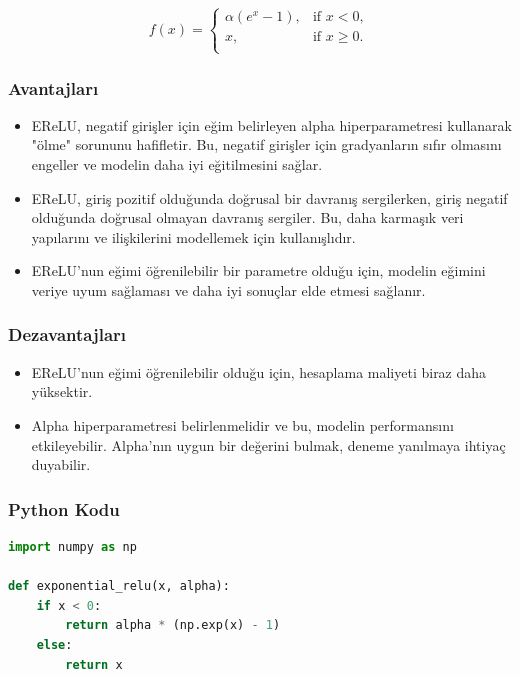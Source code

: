 \[f(x) = \begin{cases} 
\alpha(e^x - 1), & \text{if } x < 0, \\
x, & \text{if } x \geq 0. \\
\end{cases}\]

\subsubsection{Avantajları}
\begin{itemize}
    \item EReLU, negatif girişler için eğim belirleyen alpha hiperparametresi kullanarak "ölme" sorununu hafifletir. Bu, negatif girişler için gradyanların sıfır olmasını engeller ve modelin daha iyi eğitilmesini sağlar.
    \item EReLU, giriş pozitif olduğunda doğrusal bir davranış sergilerken, giriş negatif olduğunda doğrusal olmayan davranış sergiler. Bu, daha karmaşık veri yapılarını ve ilişkilerini modellemek için kullanışlıdır.
    \item EReLU'nun eğimi öğrenilebilir bir parametre olduğu için, modelin eğimini veriye uyum sağlaması ve daha iyi sonuçlar elde etmesi sağlanır.
\end{itemize}

\subsubsection{Dezavantajları}
\begin{itemize}
    \item EReLU'nun eğimi öğrenilebilir olduğu için, hesaplama maliyeti biraz daha yüksektir.
    \item Alpha hiperparametresi belirlenmelidir ve bu, modelin performansını etkileyebilir. Alpha'nın uygun bir değerini bulmak, deneme yanılmaya ihtiyaç duyabilir.
\end{itemize}

\subsubsection{Python Kodu}

\begin{lstlisting}[language=Python]
import numpy as np

def exponential_relu(x, alpha):
    if x < 0:
        return alpha * (np.exp(x) - 1)
    else:
        return x
\end{lstlisting}

